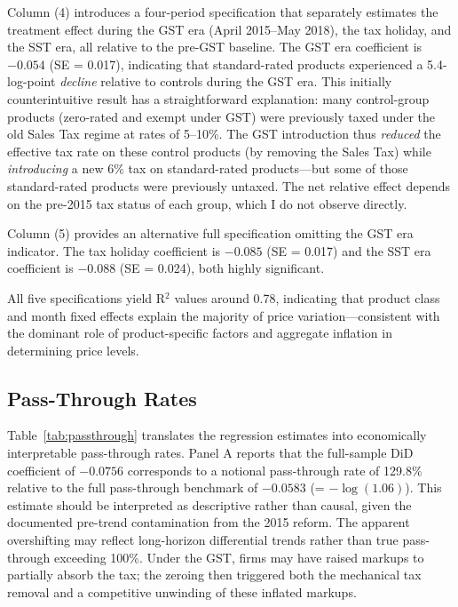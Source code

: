 \documentclass[12pt]{article}
\begin{document}
Column (4) introduces a four-period specification that separately estimates the treatment effect during the GST era (April 2015--May 2018), the tax holiday, and the SST era, all relative to the pre-GST baseline. The GST era coefficient is $-0.054$ (SE = 0.017), indicating that standard-rated products experienced a 5.4-log-point \emph{decline} relative to controls during the GST era. This initially counterintuitive result has a straightforward explanation: many control-group products (zero-rated and exempt under GST) were previously taxed under the old Sales Tax regime at rates of 5--10\%. The GST introduction thus \emph{reduced} the effective tax rate on these control products (by removing the Sales Tax) while \emph{introducing} a new 6\% tax on standard-rated products---but some of those standard-rated products were previously untaxed. The net relative effect depends on the pre-2015 tax status of each group, which I do not observe directly.

Column (5) provides an alternative full specification omitting the GST era indicator. The tax holiday coefficient is $-0.085$ (SE = 0.017) and the SST era coefficient is $-0.088$ (SE = 0.024), both highly significant.

All five specifications yield R$^2$ values around 0.78, indicating that product class and month fixed effects explain the majority of price variation---consistent with the dominant role of product-specific factors and aggregate inflation in determining price levels.



\subsection{Pass-Through Rates}

Table~\ref{tab:passthrough} translates the regression estimates into economically interpretable pass-through rates. Panel A reports that the full-sample DiD coefficient of $-0.0756$ corresponds to a notional pass-through rate of 129.8\% relative to the full pass-through benchmark of $-0.0583$ (= $-\log(1.06)$). This estimate should be interpreted as descriptive rather than causal, given the documented pre-trend contamination from the 2015 reform. The apparent overshifting may reflect long-horizon differential trends rather than true pass-through exceeding 100\%. Under the GST, firms may have raised markups to partially absorb the tax; the zeroing then triggered both the mechanical tax removal and a competitive unwinding of these inflated markups.
\end{document}
